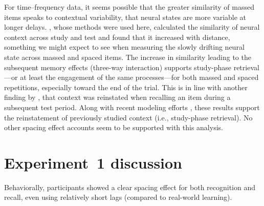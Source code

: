 For time--frequency data, it seems possible that the greater similarity of massed items speaks to contextual variability, that neural states are more variable at longer delays.  , whose methods were used here, calculated the similarity of neural context across study and test and found that it increased with distance, something we might expect to see when measuring the slowly drifting neural state across massed and spaced items.
The increase in similarity leading to the subsequent memory effects (three-way interaction) supports study-phase retrieval---or at least the engagement of the same processes---for both massed and spaced repetitions, especially toward the end of the trial.  This is in line with another finding by , that context was reinstated when recalling an item during a subsequent test period.  Along with recent modeling efforts \cite{LohnKaha2014b}, these results support the reinstatement of previously studied context (i.e., study-phase retrieval).
No other spacing effect accounts seem to be supported with this analysis.








\section{Experiment~1 discussion}

Behaviorally, participants showed a clear spacing effect for both recognition and recall, even using relatively short lags (compared to real-world learning).

